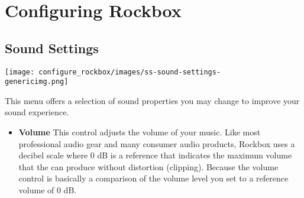 \chapter{Configuring Rockbox}
\label{ref:configure_rockbox}
\section{Sound Settings}
\begin{center}
  \texttt{[image: configure\_rockbox/images/ss-sound-settings-\\genericimg.png]}
\end{center}

This menu offers a selection of sound properties you may change to improve your sound experience.

\begin{itemize}
\item \textbf{Volume}
  This control adjusts the volume of your music.  Like most professional audio gear and many consumer audio products, Rockbox uses a decibel scale where 0 dB is a reference that indicates the maximum volume that the \dap can produce without distortion (clipping).  Because the volume control is basically a comparison of the volume level you set to a reference volume of 0 dB.
  

\end{itemize}
